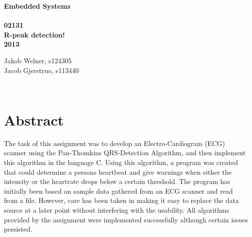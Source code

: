 \documentclass[12pt,a4paper]{article}
\begin{document}
\begin{titlepage}
	\begin{center}
		\vspace*{13\baselineskip}
		\huge
		\bfseries
		Embedded Systems\\ 
		\ \\
		02131 \\[5\baselineskip]

		\normalfont
		\Large
		R-peak detection!\\	
		2013

		\small
		\vfill
	\end{center}	
	\begin{flushleft}
		Jakob Welner, s124305\\
	 	Jacob Gjerstruo, s113440\\
	\end{flushleft}
\end{titlepage}

\ \\
\section*{Abstract}
The task of this assignment was to develop an Electro-Cardiogram (ECG) scanner using the Pan-Thomkins QRS-Detection Algorithm, and then implement this algorithm in the language C. Using this algorithm, a program was created that could determine a persons heartbeat and give warnings when either the intensity or the heartrate drops below a certain threshold. The program has initially been based on sample data gathered from an ECG scanner and read from a file. However, care has been taken in making it easy to replace the data source at a later point without interfering with the usability. 
All algorithms provided by the assignment were implemented successfully although certain issues persisted.

\thispagestyle{empty} 
\newpage

\tableofcontents
\thispagestyle{empty} 
\newpage

\setcounter{page}{1}

\ \\
\end{document}
